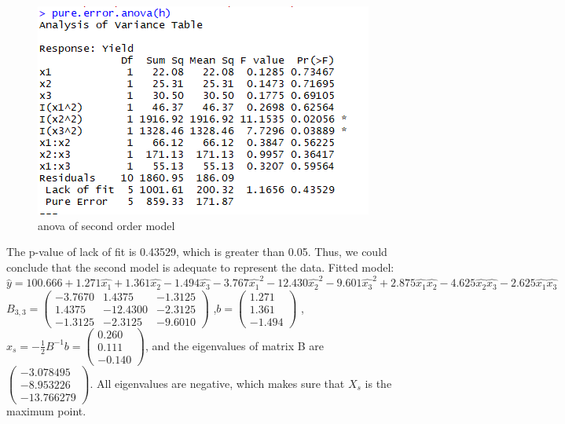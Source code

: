 \documentclass[11pt]{article}
\begin{document}
\begin{figure}[h!]
  
  \center
  \includegraphics[scale = .45]{pictures/anova_growth.png}
  \caption{anova of second order model}
  \label{fig:anova_growth}
\end{figure}

The p-value of lack of fit is 0.43529, which is greater than 0.05. Thus, we could conclude that the second model is adequate to represent the data.
Fitted model:
$\hat{y} = 100.666 + 1.271\hat{x_1} + 1.361\hat{x_2} - 1.494\hat{x_3} - 3.767\hat{x_1}^2 - 12.430\hat{x_2}^2 - 9.601\hat{x_3}^2 + 2.875\hat{x_1}\hat{x_2} - 4.625\hat{x_2}\hat{x_3} - 2.625\hat{x_1}\hat{x_3}$
\\
$B_{3,3} = 
 \begin{pmatrix}
  -3.7670 & 1.4375 & -1.3125 \\
  1.4375 & -12.4300  & -2.3125 \\
  -1.3125 & -2.3125 & -9.6010 
 \end{pmatrix}$
,$b =
\begin{pmatrix}
   1.271\\
  1.361\\
  -1.494 
 \end{pmatrix}$
,$x_s = -\frac{1}{2}B^{-1}b = \begin{pmatrix}
    0.260\\
  0.111\\
  -0.140
 \end{pmatrix} $, and the eigenvalues of matrix B are $\begin{pmatrix}
   -3.078495\\
  -8.953226\\
  -13.766279
 \end{pmatrix} $. All eigenvalues are negative, which makes sure that $X_s$ is the maximum point.
\end{document}
